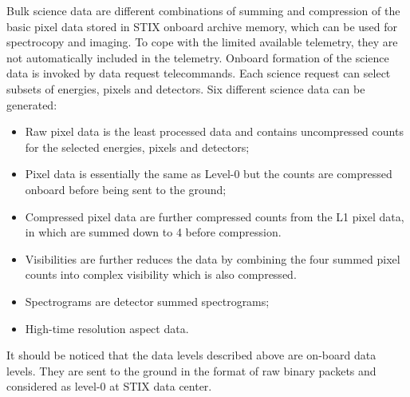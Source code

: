 \documentclass{aa}
\begin{document}
Bulk science data are different combinations of summing and compression of the basic pixel data stored in STIX onboard archive memory, which can be used for spectrocopy and imaging.
To cope with the limited available telemetry, they are not automatically included in the telemetry.
Onboard formation of the science data is invoked by data request telecommands.
Each science request can select subsets of energies, pixels and detectors.
Six different science data can be generated:
\begin{itemize}
 \item Raw pixel data is the least processed data and contains uncompressed counts for the selected energies, pixels and detectors;
\item Pixel data is essentially the same as Level-0 but the counts are compressed onboard before being sent to the ground;
\item Compressed pixel data are further compressed counts from the L1 pixel data, in which are summed down to 4 before compression.
\item Visibilities are further reduces the data by combining the four summed pixel counts into complex visibility which is also compressed.
\item Spectrograms are detector summed spectrograms;
\item High-time resolution aspect data.
\end{itemize}
It should be noticed that the data levels described 
above are on-board data levels. They are sent to the ground in the format of raw binary packets and 
considered as level-0 at STIX data center.  
\begin{table}[h]
\centering
\caption{STIX raw telemetry data coverage, data rate and typical reception delay at SDC.  }
\label{tb:raw_types}
\end{table}
\end{document}
